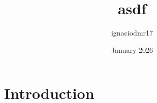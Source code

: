 \documentclass{article}
\title{asdf}
\author{ignaciodmr17 }
\date{January 2026}
\begin{document}
\maketitle

\section{Introduction}
\end{document}
